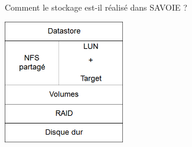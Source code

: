 \begin{frame}{Comment le stockage est-il réalisé dans SAVOIE ?}
\begin{center}
\includegraphics[width=200px]{Schemas/Concepts_Stockage.png}
\end{center}
\end{frame}
